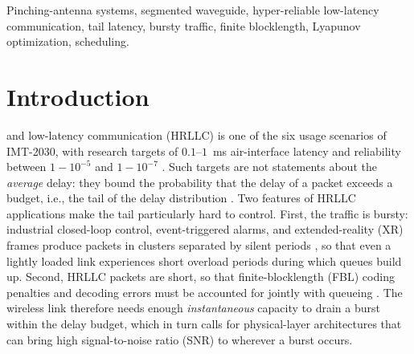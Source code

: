 \documentclass[journal]{IEEEtran}
\begin{document}
\begin{IEEEkeywords}
Pinching-antenna systems, segmented waveguide, hyper-reliable low-latency communication, tail latency, bursty traffic, finite blocklength, Lyapunov optimization, scheduling.
\end{IEEEkeywords}

\IEEEpeerreviewmaketitle

\section{Introduction}
 and low-latency communication (HRLLC) is one of the six usage scenarios of IMT-2030, with research targets of $0.1$--$1$~ms air-interface latency and reliability between $1-10^{-5}$ and $1-10^{-7}$ \cite{ITUR-M2160}. Such targets are not statements about the \emph{average} delay: they bound the probability that the delay of a packet exceeds a budget, i.e., the tail of the delay distribution \cite{Bennis2018}. Two features of HRLLC applications make the tail particularly hard to control. First, the traffic is bursty: industrial closed-loop control, event-triggered alarms, and extended-reality (XR) frames produce packets in clusters separated by silent periods \cite{3GPP-TS22104,3GPP-TR38838,Zhang2025HRL}, so that even a lightly loaded link experiences short overload periods during which queues build up. Second, HRLLC packets are short, so that finite-blocklength (FBL) coding penalties and decoding errors must be accounted for jointly with queueing \cite{Polyanskiy2010,Durisi2016,Zhao2022QueueAware,Li2024RLR}. The wireless link therefore needs enough \emph{instantaneous} capacity to drain a burst within the delay budget, which in turn calls for physical-layer architectures that can bring high signal-to-noise ratio (SNR) to wherever a burst occurs.
\end{document}
